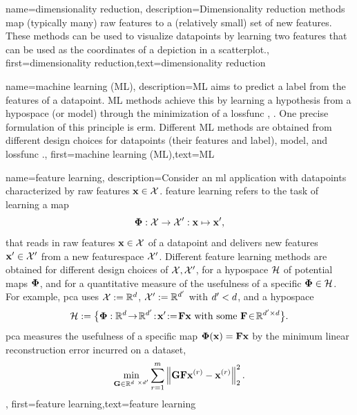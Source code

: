 {name={dimensionality reduction},
	description={Dimensionality reduction methods 
		map (typically many) raw \gls{feature}s to a (relatively small) set of 
		new \gls{feature}s. These methods can be used to visualize \gls{datapoint}s 
		by learning two \gls{feature}s that can be used as the coordinates of a 
		depiction in a \gls{scatterplot}.}, first={dimensionality reduction},text={dimensionality reduction}
} 



{name={machine learning (ML)},
		 description={ML aims to predict 
	 a \gls{label} from the \gls{feature}s of a \gls{datapoint}. ML methods achieve 
	 this by learning a \gls{hypothesis} from a \gls{hypospace} (or \gls{model}) 
	 through the minimization of a \gls{lossfunc} \cite{MLBasics}, \cite{HastieWainwrightBook}. 
	 One precise formulation of this principle is \gls{erm}. Different ML methods are 
	 obtained from different design choices for \gls{datapoint}s (their \gls{feature}s and \gls{label}), 
	 \gls{model}, and \gls{lossfunc} \cite[Ch. 3]{MLBasics}.},
	first={machine learning (ML)},text={ML}
} 


{name={feature learning},
	description={Consider an \gls{ml} application with \gls{datapoint}s characterized by 
		raw \gls{feature}s ${\bf x} \in \mathcal{X}$. \Gls{feature} learning 
		refers to the task of learning a map 
		$${\bf \Phi}: \mathcal{X} \rightarrow \mathcal{X}': {\bf x} \mapsto {\bf x}',$$ 
		that reads in raw \gls{feature}s ${\bf x} \in \mathcal{X}$ of a \gls{datapoint} and delivers new 
		\gls{feature}s ${\bf x}' \in \mathcal{X}'$ from a new \gls{featurespace} $\mathcal{X}'$. 
		Different \gls{feature} learning methods are obtained for different design 
		choices of $\mathcal{X},\mathcal{X}'$, for a \gls{hypospace} $\mathcal{H}$ 
		of potential maps ${\bf \Phi}$, and for a quantitative measure of the usefulness of 
		a specific ${\bf \Phi} \in \mathcal{H}$. For example, \gls{pca} 
		uses $\mathcal{X} := \mathbb{R}^{d}$, $\mathcal{X}' := \mathbb{R}^{d'}$ 
		with $d' < d$, and a \gls{hypospace} 
		$$\hypospace\defeq \big\{ \featuremapvec: \mathbb{R}^{\dimlocalmodel}
		\!\rightarrow\! \mathbb{R}^{\dimlocalmodel'}\!:\!\featurevec'\!\defeq\!\mF \featurevec \mbox{ with some } \mF \!\in\! \mathbb{R}^{\dimlocalmodel' \times \dimlocalmodel} \big\}.$$ \Gls{pca} measures the usefulness of a specific map ${\bf \Phi}({\bf x})= \mathbf{F} {\bf x}$ 
	by the \gls{minimum} linear reconstruction error incurred on a \gls{dataset}, 
$$ \min_{\mG \in \mathbb{R}^{\dimlocalmodel \times \dimlocalmodel'}} \sum_{\sampleidx=1}^{\samplesize} \normgeneric{\mG \mF \featurevec^{(\sampleidx)} - \featurevec^{(\sampleidx)}}{2}^{2}.$$ }, 
	first={feature learning},text={feature learning}
} 

